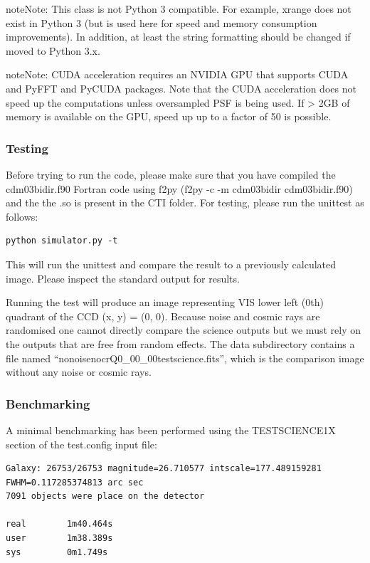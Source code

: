\documentclass[a4paper,11pt,english]{sphinxmanual}
\begin{document}
\begin{notice}{note}{Note:}
This class is not Python 3 compatible. For example, xrange does not exist
in Python 3 (but is used here for speed and memory consumption improvements).
In addition, at least the string formatting should be changed if moved to
Python 3.x.
\end{notice}

\begin{notice}{note}{Note:}
CUDA acceleration requires an NVIDIA GPU that supports CUDA and PyFFT and PyCUDA packages.
Note that the CUDA acceleration does not speed up the computations unless oversampled PSF
is being used. If \textgreater{} 2GB of memory is available on the GPU, speed up up to a factor of 50 is
possible.
\end{notice}


\subsubsection{Testing}
\label{simulator:testing}
Before trying to run the code, please make sure that you have compiled the
cdm03bidir.f90 Fortran code using f2py (f2py -c -m cdm03bidir cdm03bidir.f90) and the the .so is present in
the CTI folder. For testing,
please run the unittest as follows:

\begin{Verbatim}[commandchars=\\\{\}]
python simulator.py -t
\end{Verbatim}

This will run the unittest and compare the result to a previously calculated image.
Please inspect the standard output for results.

Running the test will produce an image representing VIS lower left (0th) quadrant of the CCD (x, y) = (0, 0). Because
noise and cosmic rays are randomised one cannot directly compare the science
outputs but we must rely on the outputs that are free from random effects. The data subdirectory
contains a file named ``nonoisenocrQ0\_00\_00testscience.fits'', which is the comparison image without
any noise or cosmic rays.


\subsubsection{Benchmarking}
\label{simulator:benchmarking}
A minimal benchmarking has been performed using the TESTSCIENCE1X section of the test.config input file:

\begin{Verbatim}[commandchars=\\\{\}]
Galaxy: 26753/26753 magnitude=26.710577 intscale=177.489159281 FWHM=0.117285374813 arc sec
7091 objects were place on the detector

real        1m40.464s
user        1m38.389s
sys         0m1.749s
\end{Verbatim}
\end{document}
